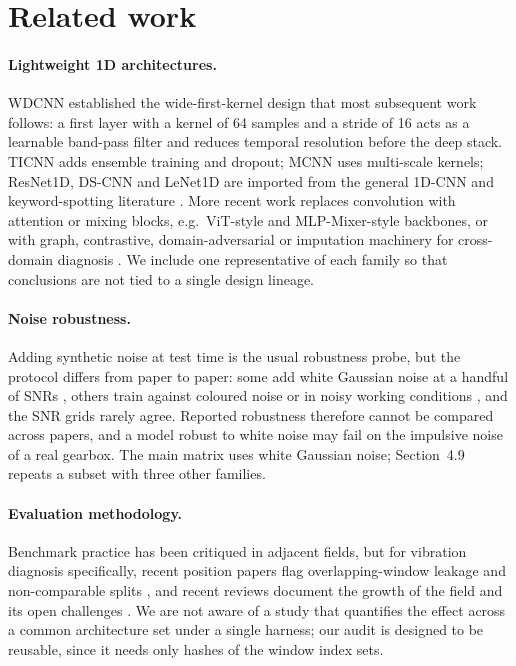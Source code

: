\documentclass[11pt,a4paper]{article}
\begin{document}
\section{Related work}

\paragraph{Lightweight 1D architectures.} WDCNN \citep{zhang2017wdcnn} established the wide-first-kernel design that most subsequent work follows: a first layer with a kernel of 64 samples and a stride of 16 acts as a learnable band-pass filter and reduces temporal resolution before the deep stack. TICNN \citep{zhang2018ticnn} adds ensemble training and dropout; MCNN \citep{zhao2019mcnn} uses multi-scale kernels; ResNet1D, DS-CNN and LeNet1D are imported from the general 1D-CNN and keyword-spotting literature \citep{he2016resnet,hannun2019dspeech}. More recent work replaces convolution with attention or mixing blocks, e.g.\ ViT-style \citep{dosovitskiy2021vit} and MLP-Mixer-style \citep{tolstikhin2021mixer} backbones, or with graph, contrastive, domain-adversarial or imputation machinery for cross-domain diagnosis \citep{tim2025a,eaa2025a,mssp2025a}. We include one representative of each family so that conclusions are not tied to a single design lineage.

\paragraph{Noise robustness.} Adding synthetic noise at test time is the usual robustness probe, but the protocol differs from paper to paper: some add white Gaussian noise at a handful of SNRs \citep{zhang2018ticnn,meas2023a}, others train against coloured noise or in noisy working conditions \citep{sr2025a,mst2024b}, and the SNR grids rarely agree. Reported robustness therefore cannot be compared across papers, and a model robust to white noise may fail on the impulsive noise of a real gearbox. The main matrix uses white Gaussian noise; Section~4.9 repeats a subset with three other families.

\paragraph{Evaluation methodology.} Benchmark practice has been critiqued in adjacent fields, but for vibration diagnosis specifically, recent position papers flag overlapping-window leakage and non-comparable splits \citep{phme2026,ssrn2024}, and recent reviews document the growth of the field and its open challenges \citep{aip2025a}. We are not aware of a study that quantifies the effect across a common architecture set under a single harness; our audit is designed to be reusable, since it needs only hashes of the window index sets.
\end{document}
